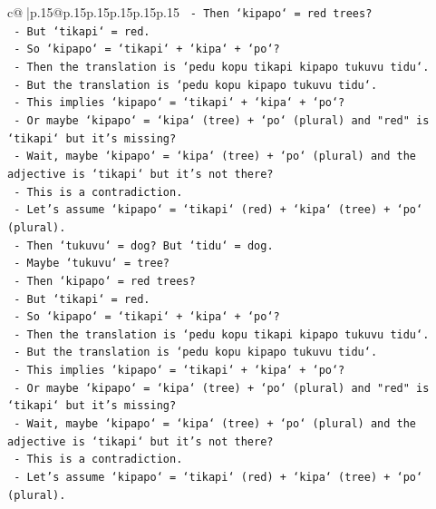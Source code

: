 \documentclass{article}
\begin{document}
{\begin{supertabular}{c@{$\;$}|p{.15\linewidth}@{}p{.15\linewidth}p{.15\linewidth}p{.15\linewidth}p{.15\linewidth}p{.15\linewidth}}
{{{\texttt{          {-} Then `kipapo` = red trees?} \\
\texttt{          {-} But `tikapi` = red.} \\
\texttt{          {-} So `kipapo` = `tikapi` + `kipa` + `po`?} \\
\texttt{          {-} Then the translation is `pedu kopu tikapi kipapo tukuvu tidu`.} \\
\texttt{          {-} But the translation is `pedu kopu kipapo tukuvu tidu`.} \\
\texttt{          {-} This implies `kipapo` = `tikapi` + `kipa` + `po`?} \\
\texttt{          {-} Or maybe `kipapo` = `kipa` (tree) + `po` (plural) and "red" is `tikapi` but it's missing?} \\
\texttt{          {-} Wait, maybe `kipapo` = `kipa` (tree) + `po` (plural) and the adjective is `tikapi` but it's not there?} \\
\texttt{          {-} This is a contradiction.} \\
\texttt{          {-} Let's assume `kipapo` = `tikapi` (red) + `kipa` (tree) + `po` (plural).} \\
\texttt{          {-} Then `tukuvu` = dog? But `tidu` = dog.} \\
\texttt{          {-} Maybe `tukuvu` = tree?} \\
\texttt{          {-} Then `kipapo` = red trees?} \\
\texttt{          {-} But `tikapi` = red.} \\
\texttt{          {-} So `kipapo` = `tikapi` + `kipa` + `po`?} \\
\texttt{          {-} Then the translation is `pedu kopu tikapi kipapo tukuvu tidu`.} \\
\texttt{          {-} But the translation is `pedu kopu kipapo tukuvu tidu`.} \\
\texttt{          {-} This implies `kipapo` = `tikapi` + `kipa` + `po`?} \\
\texttt{          {-} Or maybe `kipapo` = `kipa` (tree) + `po` (plural) and "red" is `tikapi` but it's missing?} \\
\texttt{          {-} Wait, maybe `kipapo` = `kipa` (tree) + `po` (plural) and the adjective is `tikapi` but it's not there?} \\
\texttt{          {-} This is a contradiction.} \\
\texttt{          {-} Let's assume `kipapo` = `tikapi` (red) + `kipa` (tree) + `po` (plural).} \\
}}}
\end{supertabular}}
\end{document}

